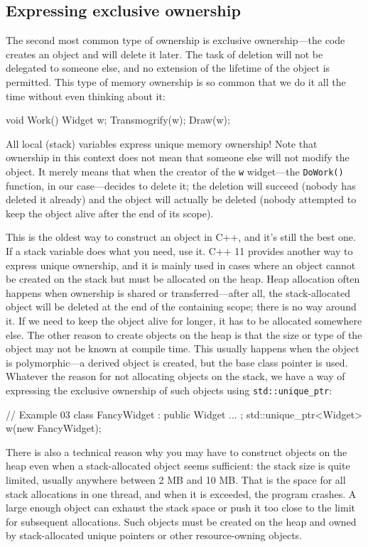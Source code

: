 \subsection{Expressing exclusive ownership}

The second most common type of ownership is exclusive ownership---the code creates an object and will delete it later. The task of deletion will not be delegated to someone else, and no extension of the lifetime of the object is permitted. This type of memory ownership is so common that we do it all the time without even thinking about it:

\begin{code}
void Work() {
  Widget w;
  Transmogrify(w);
  Draw(w);
}
\end{code}

All local (stack) variables express unique memory ownership! Note that ownership in this context does not mean that someone else will not modify the object. It merely means that when the creator of the \texttt{w} widget---the \texttt{DoWork()} function, in our case---decides to delete it; the deletion will succeed (nobody has deleted it already) and the object will actually be deleted (nobody attempted to keep the object alive after the end of its scope).

This is the oldest way to construct an object in C++, and it's still the best one. If a stack variable does what you need, use it. C++ 11 provides another way to express unique ownership, and it is mainly used in cases where an object cannot be created on the stack but must be allocated on the heap. Heap allocation often happens when ownership is shared or transferred---after all, the stack-allocated object will be deleted at the end of the containing scope; there is no way around it. If we need to keep the object alive for longer, it has to be allocated somewhere else. The other reason to create objects on the heap is that the size or type of the object may not be known at compile time. This usually happens when the object is polymorphic---a derived object is created, but the base class pointer is used. Whatever the reason for not allocating objects on the stack, we have a way of expressing the exclusive ownership of such objects using \texttt{std::unique\_ptr}:

\begin{code}
// Example 03
class FancyWidget : public Widget { ... };
std::unique_ptr<Widget> w(new FancyWidget);
\end{code}

There is also a technical reason why you may have to construct objects on the heap even when a stack-allocated object seems sufficient: the stack size is quite limited, usually anywhere between 2 MB and 10 MB. That is the space for all stack allocations in one thread, and when it is exceeded, the program crashes. A large enough object can exhaust the stack space or push it too close to the limit for subsequent allocations. Such objects must be created on the heap and owned by stack-allocated unique pointers or other resource-owning objects.

